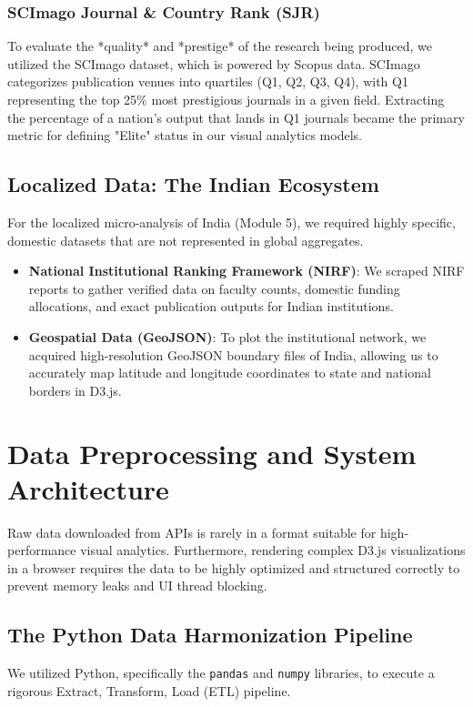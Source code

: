 \documentclass[12pt,a4paper]{article}
\begin{document}
\subsubsection{SCImago Journal \& Country Rank (SJR)}
To evaluate the *quality* and *prestige* of the research being produced, we utilized the SCImago dataset, which is powered by Scopus data. SCImago categorizes publication venues into quartiles (Q1, Q2, Q3, Q4), with Q1 representing the top 25\% most prestigious journals in a given field. Extracting the percentage of a nation's output that lands in Q1 journals became the primary metric for defining "Elite" status in our visual analytics models.

\subsection{Localized Data: The Indian Ecosystem}
For the localized micro-analysis of India (Module 5), we required highly specific, domestic datasets that are not represented in global aggregates.
\begin{itemize}
    \item \textbf{National Institutional Ranking Framework (NIRF)}: We scraped NIRF reports to gather verified data on faculty counts, domestic funding allocations, and exact publication outputs for Indian institutions.
    \item \textbf{Geospatial Data (GeoJSON)}: To plot the institutional network, we acquired high-resolution GeoJSON boundary files of India, allowing us to accurately map latitude and longitude coordinates to state and national borders in D3.js.
\end{itemize}

\newpage
\section{Data Preprocessing and System Architecture}
Raw data downloaded from APIs is rarely in a format suitable for high-performance visual analytics. Furthermore, rendering complex D3.js visualizations in a browser requires the data to be highly optimized and structured correctly to prevent memory leaks and UI thread blocking. 

\subsection{The Python Data Harmonization Pipeline}
We utilized Python, specifically the \texttt{pandas} and \texttt{numpy} libraries, to execute a rigorous Extract, Transform, Load (ETL) pipeline.
\end{document}
